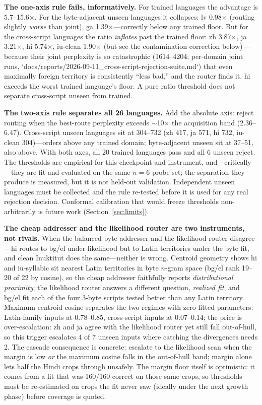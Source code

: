 \documentclass[11pt]{article}
\theoremstyle{definition}\newtheorem{definition}{Definition}
\theoremstyle{remark}\newtheorem{remark}{Remark}
\begin{document}
\textbf{The one-axis rule fails, informatively.} For trained languages the advantage is
5.7--15.6$\times$. For the byte-adjacent unseen languages it collapses: lv 0.98$\times$
(routing slightly \emph{worse} than joint), ga 1.39$\times$---correctly below any
trained floor. But for the cross-script languages the ratio \emph{inflates} past the
trained floor: zh 3.87$\times$, ja 3.21$\times$, hi 5.74$\times$, iu-clean 1.90$\times$
(but see the contamination correction below)---because their joint perplexity is so
catastrophic (1614--4204; per-domain joint runs, `docs/reports/2026-09-11\_cross-script-rejection-suite.md`) that even maximally foreign territory is consistently ``less
bad,'' and the router finds it. hi exceeds the worst trained language's floor. A pure
ratio threshold does not separate cross-script unseen from trained.

\textbf{The two-axis rule separates all 26 languages.} Add the absolute axis: reject
routing when the best-route perplexity exceeds $\sim$10$\times$ the acquisition band
(2.36--6.47). Cross-script unseen languages sit at 304--732 (zh 417, ja 571, hi 732,
iu-clean 304)---orders above any trained domain; byte-adjacent unseen sit at 37--51,
also above. With both axes, all 20 trained languages pass and all 6 unseen reject. The
thresholds are empirical for this checkpoint and instrument, and---critically---they are
fit and evaluated on the same $n{=}6$ probe set; the separation they produce is measured, but
it is not held-out validation. Independent unseen languages must be collected and the rule
re-tested before it is used for any real rejection decision. Conformal calibration that
would freeze thresholds non-arbitrarily is future work (Section~\ref{sec:limits}).

\textbf{The cheap addresser and the likelihood router are two instruments, not rivals.}
When the balanced byte addresser and the likelihood router disagree---hi routes to bg/el
under likelihood but to Latin territories under the byte fit, and clean Inuktitut does the
same---neither is wrong. Centroid geometry shows hi and iu-syllabic sit nearest Latin
territories in byte $n$-gram space (bg/el rank 19--20 of 22 by cosine), so the cheap
addresser faithfully reports \emph{distributional proximity}; the likelihood router answers
a different question, \emph{realized fit}, and bg/el fit each of the four 3-byte scripts tested better than any
Latin territory. Maximum-centroid cosine separates the two regimes with zero fitted
parameters: Latin-family inputs at 0.78--0.85, cross-script inputs at 0.07--0.14; the price is over-escalation: zh and ja agree with the likelihood router yet still fall out-of-hull, so this trigger escalates 4 of 7 unseen inputs where catching the divergences needs 2. The
cascade consequence is concrete: escalate to the likelihood scan when the margin is low
\emph{or} the maximum cosine falls in the out-of-hull band; margin alone lets half the
Hindi crops through unsafely. The margin floor itself is optimistic: it comes from a fit that was 160/160 correct on those same crops, so thresholds must be re-estimated on crops the fit never saw (ideally under the next growth phase) before coverage is quoted.
\end{document}
